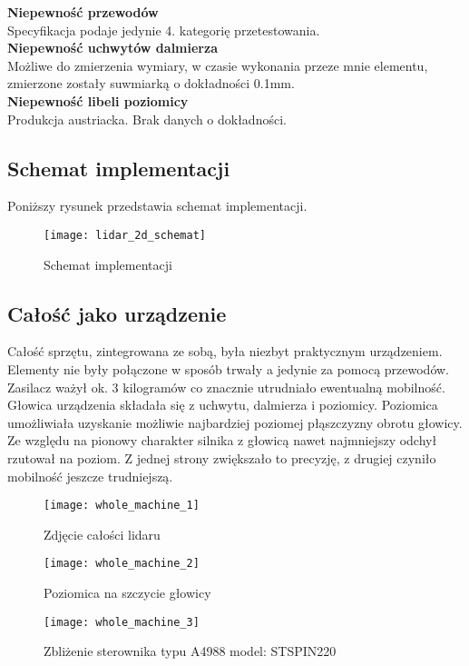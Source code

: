 \textbf{Niepewność przewodów}\\
Specyfikacja podaje jedynie 4. kategorię przetestowania.\\

\textbf{Niepewność uchwytów dalmierza}\\
Możliwe do zmierzenia wymiary, w czasie wykonania przeze mnie elementu, zmierzone zostały suwmiarką o dokładności 0.1mm.\\

\textbf{Niepewność libeli poziomicy}\\
Produkcja austriacka. Brak danych o dokładności.

\newpage
\subsection {Schemat implementacji}
Poniższy rysunek przedstawia schemat implementacji.

\begin{figure}[h]
    \centering
    \texttt{[image: lidar\_2d\_schemat]}
    \caption{Schemat implementacji}
    \label{fig:lidar_2d_schemat}
\end{figure}

\subsection {Całość jako urządzenie}
Całość sprzętu, zintegrowana ze sobą, była niezbyt praktycznym urządzeniem. Elementy nie były połączone w sposób trwały a jedynie za pomocą przewodów. Zasilacz ważył ok. 3 kilogramów co znacznie utrudniało ewentualną mobilność.\\

Głowica urządzenia składała się z uchwytu, dalmierza i poziomicy. Poziomica umożliwiała uzyskanie możliwie najbardziej poziomej płąszczyzny obrotu głowicy. Ze względu na pionowy charakter silnika z głowicą nawet najmniejszy odchył rzutował na poziom. Z jednej strony zwiększało to precyzję, z drugiej czyniło mobilność jeszcze trudniejszą.\\

\begin{figure}[h]
    \centering
    \texttt{[image: whole\_machine\_1]}
    \caption{Zdjęcie całości lidaru}
    \label{fig:whole_machine_1}
\end{figure}

\begin{figure}[h]
    \centering
    \texttt{[image: whole\_machine\_2]}
    \caption{Poziomica na szczycie głowicy}
    \label{fig:whole_machine_2}
\end{figure}

\begin{figure}[h]
    \centering
    \texttt{[image: whole\_machine\_3]}
    \caption{Zbliżenie sterownika typu A4988 model: STSPIN220}
    \label{fig:whole_machine_3}
\end{figure}